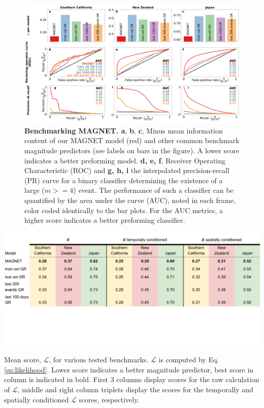 \documentclass[pdflatex]{sn-jnl}
\begin{document}
\begin{figure}[h!]
    \centering
    \includegraphics[width=1\textwidth]{figures/combined_barplots.pdf}
    \caption{
        \textbf{Benchmarking MAGNET. a}, \textbf{b}, \textbf{c}, Minus mean information content of our MAGNET model (red) and other common benchmark magnitude predictors (see labels on bars in the figure). A lower score indicates a better preforming model. \textbf{d, e, f}, Receiver Operating Characteristic (ROC) and \textbf{g, h, i} the interpolated precision-recall (PR) curve for a binary classifier determining the existence of a large ($m>=4$) event. The performance of such a classifier can be quantified by the area under the curve (AUC), noted in each frame, color coded identically to the bar plots. For the AUC metrics, a higher score indicates a better preforming classifier.
        }
        \label{fig:metrics}
\end{figure}


\begin{table}[h!]
    \centering
    \includegraphics[width=1\textwidth]{figures/main_text_table.pdf}
    \caption{Mean score, $\mathcal{L}$, for various tested benchmarks. $\mathcal{L}$ is computed by Eq. \ref{eq:likelihood}. Lower score indicates a better magnitude predictor, best score in column is indicated in bold. First 3 columns display scores for the raw calculation of $\mathcal{L}$, middle and right column triplets display the scores for the temporally and spatially conditioned $\mathcal{L}$ scores, respectively.
    }
    \label{tab:mean_ll_benchmarks_main_text}
\end{table}
   
\end{document}
